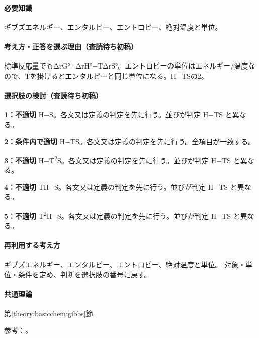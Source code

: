 \paragraph{必要知識} ギブズエネルギー、エンタルピー、エントロピー、絶対温度と単位。

\paragraph{考え方・正答を選ぶ理由（査読待ち初稿）} 標準反応量でもΔrG°=ΔrH°−TΔrS°。エントロピーの単位はエネルギー/温度なので、Tを掛けるとエンタルピーと同じ単位になる。H−TSの2。

\paragraph{選択肢の検討（査読待ち初稿）}\mbox{}\par

\noindent\textbf{1：不適切} H−S。各文又は定義の判定を先に行う。並びが判定 H−TS と異なる。\par

\noindent\textbf{2：条件内で適切} H−TS。各文又は定義の判定を先に行う。全項目が一致する。\par

\noindent\textbf{3：不適切} H−T\textsuperscript{2}S。各文又は定義の判定を先に行う。並びが判定 H−TS と異なる。\par

\noindent\textbf{4：不適切} TH−S。各文又は定義の判定を先に行う。並びが判定 H−TS と異なる。\par

\noindent\textbf{5：不適切} T\textsuperscript{2}H−S。各文又は定義の判定を先に行う。並びが判定 H−TS と異なる。\par

\paragraph{再利用する考え方} ギブズエネルギー、エンタルピー、エントロピー、絶対温度と単位。 対象・単位・条件を定め、判断を選択肢の番号に戻す。

\paragraph{共通理論} \hyperref[theory:basicchem:gibbs]{第\ref*{theory:basicchem:gibbs}節}

\par 参考：\cite{chem55_gibbs}。

